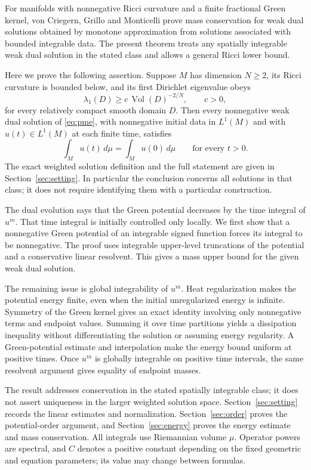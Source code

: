 \documentclass[11pt]{article}
\theoremstyle{definition}
\theoremstyle{remark}
\newcommand{\dd}{\,d\mu}
\newcommand{\intM}{\int_M}
\DeclareMathOperator{\Vol}{Vol}
\begin{document}
For manifolds with nonnegative Ricci curvature and a finite fractional
Green kernel, von Criegern, Grillo and Monticelli
\cite[Corollary~8.6]{CGM} prove mass conservation for weak dual
solutions obtained by monotone approximation from solutions associated
with bounded integrable data. The present theorem treats any spatially
integrable weak dual solution in the stated class and allows a general
Ricci lower bound.

Here we prove the following assertion. Suppose \(M\) has dimension
\(N\ge2\), its Ricci curvature is bounded below, and its first
Dirichlet eigenvalue obeys
\[
 \lambda_1(D)\ge c\,\Vol(D)^{-2/N},\qquad c>0,
\]
for every relatively compact smooth domain \(D\).
Then every nonnegative weak dual solution of \eqref{eq:pme}, with
nonnegative initial data in \(L^1(M)\) and with \(u(t)\in L^1(M)\)
at each finite time, satisfies
\[
 \intM u(t)\dd=\intM u(0)\dd\qquad\text{for every }t>0.
\]
The exact weighted solution definition and the full statement are
given in Section~\ref{sec:setting}. In particular the conclusion
concerns all solutions in that class; it does not require identifying
them with a particular construction.

The dual evolution says that the Green potential decreases by the
time integral of \(u^m\). That time integral is initially controlled
only locally. We first show that a nonnegative Green potential of
an integrable signed function forces its integral to be nonnegative.
The proof uses integrable upper-level truncations of the potential
and a conservative linear resolvent. This gives a mass upper bound
for the given weak dual solution.

The remaining issue is global integrability of \(u^m\).
Heat regularization makes the potential energy finite, even when the
initial unregularized energy is infinite. Symmetry of the Green kernel
gives an exact identity involving only nonnegative terms and endpoint
values. Summing it over time partitions yields a dissipation
inequality without differentiating the solution or assuming energy
regularity. A Green-potential estimate and interpolation make the
energy bound uniform at positive times. Once \(u^m\) is globally
integrable on positive time intervals, the same resolvent argument
gives equality of endpoint masses.

The result addresses conservation in the stated spatially integrable
class; it does not assert uniqueness in the larger weighted solution
space. Section~\ref{sec:setting} records the linear estimates and
normalization. Section~\ref{sec:order} proves the potential-order
argument, and Section~\ref{sec:energy} proves the energy estimate and
mass conservation. All integrals use Riemannian volume \(\mu\).
Operator powers are spectral, and \(C\) denotes a positive constant
depending on the fixed geometric and equation parameters; its value
may change between formulas.
\end{document}
